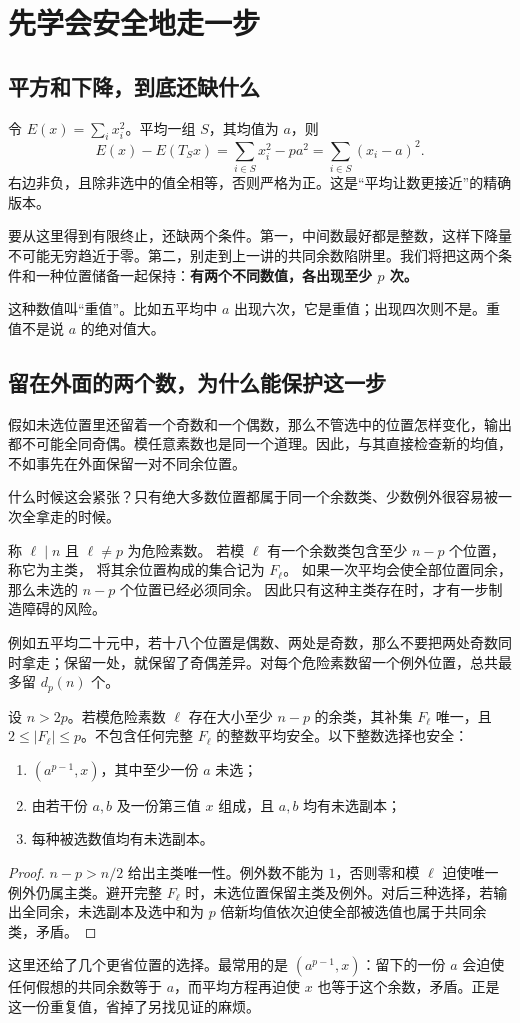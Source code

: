 \chapter{先学会安全地走一步}\label{sec:descent}
\section{平方和下降，到底还缺什么}
令 $E(x)=\sum_i x_i^2$。平均一组 $S$，其均值为 $a$，则
\[
E(x)-E(T_Sx)=\sum_{i\in S}x_i^2-pa^2
=\sum_{i\in S}(x_i-a)^2.
\]
右边非负，且除非选中的值全相等，否则严格为正。这是“平均让数更接近”的精确版本。

要从这里得到有限终止，还缺两个条件。第一，中间数最好都是整数，这样下降量不可能无穷趋近于零。第二，别走到上一讲的共同余数陷阱里。我们将把这两个条件和一种位置储备一起保持：\textbf{有两个不同数值，各出现至少 $p$ 次。}

这种数值叫“重值”。比如五平均中 $a$ 出现六次，它是重值；出现四次则不是。重值不是说 $a$ 的绝对值大。

\section{留在外面的两个数，为什么能保护这一步}
假如未选位置里还留着一个奇数和一个偶数，那么不管选中的位置怎样变化，输出都不可能全同奇偶。模任意素数也是同一个道理。因此，与其直接检查新的均值，不如事先在外面保留一对不同余位置。

什么时候这会紧张？只有绝大多数位置都属于同一个余数类、少数例外很容易被一次全拿走的时候。
\begin{definition}[危险素数与危险集]
称 $\ell\mid n$ 且 $\ell\ne p$ 为危险素数。
若模 $\ell$ 有一个余数类包含至少 $n-p$ 个位置，称它为主类，
将其余位置构成的集合记为 $F_\ell$。
如果一次平均会使全部位置同余，那么未选的 $n-p$ 个位置已经必须同余。
因此只有这种主类存在时，才有一步制造障碍的风险。
\end{definition}
例如五平均二十元中，若十八个位置是偶数、两处是奇数，那么不要把两处奇数同时拿走；保留一处，就保留了奇偶差异。对每个危险素数留一个例外位置，总共最多留 $d_p(n)$ 个。
\begin{lemma}[由未选位置保证安全]\label{lem:safety}
设 $n>2p$。若模危险素数 $\ell$ 存在大小至少 $n-p$ 的余类，其补集 $F_\ell$ 唯一，且 $2\le|F_\ell|\le p$。不包含任何完整 $F_\ell$ 的整数平均安全。以下整数选择也安全：
\begin{enumerate}
\item $(a^{p-1},x)$，其中至少一份 $a$ 未选；
\item 由若干份 $a,b$ 及一份第三值 $x$ 组成，且 $a,b$ 均有未选副本；
\item 每种被选数值均有未选副本。
\end{enumerate}
\end{lemma}
\begin{proof}
$n-p>n/2$ 给出主类唯一性。例外数不能为 $1$，否则零和模 $\ell$ 迫使唯一例外仍属主类。避开完整 $F_\ell$ 时，未选位置保留主类及例外。对后三种选择，若输出全同余，未选副本及选中和为 $p$ 倍新均值依次迫使全部被选值也属于共同余类，矛盾。
\end{proof}
这里还给了几个更省位置的选择。最常用的是 $(a^{p-1},x)$：留下的一份 $a$ 会迫使任何假想的共同余数等于 $a$，而平均方程再迫使 $x$ 也等于这个余数，矛盾。正是这一份重复值，省掉了另找见证的麻烦。


